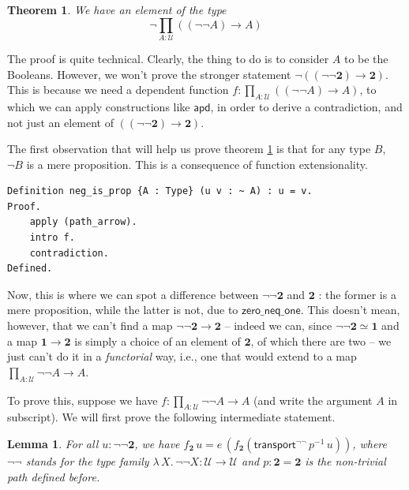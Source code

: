 \documentclass[12 pt]{amsart}
\newtheorem{theorem}[subsubsection]{Theorem}
\newtheorem{lemma}[subsubsection]{Lemma}
\theoremstyle{definition}
\theoremstyle{remark}
\newcommand{\Type}{\mathcal{U}}
\newcommand{\trans}{\mathsf{transport}}
\newcommand{\apd}{\mathsf{apd}}
\newcommand{\bool}{{\mathbf{2}}}
\newcommand{\one}{{\mathbf{1}}}
\newcommand{\no}{\lnot}
\newcommand{\zeroneqone}{{\mathsf{zero\_neq\_one}}}
\begin{document}
\begin{theorem}
We have an element of the type
\[\no \prod_{A : \Type} \left((\no \no A) \to A\right)\]
\label{thm:double_neg}
\end{theorem}

The proof is quite technical. Clearly, the thing to do is to consider $A$ to be the Booleans. However, we won't prove the stronger statement $\no ((\no \no \bool) \to \bool)$. This is because we need a dependent function $f : \prod_{A : \Type} \left((\no \no A) \to A\right)$, to which we can apply constructions like $\apd$, in order to derive a contradiction, and not just an element of $((\no \no \bool) \to \bool)$. 

The first observation that will help us prove theorem \ref{thm:double_neg} is that for any type $B$, $\no B$  is a mere proposition. This is a consequence of function extensionality.

\begin{lstlisting}
Definition neg_is_prop {A : Type} (u v : ~ A) : u = v.
Proof.
    apply (path_arrow).
    intro f.
    contradiction.
Defined.  
\end{lstlisting}

Now, this is where we can spot a difference between $\no\no \bool$ and $\bool$ : the former is a mere proposition, while the latter is not, due to $\zeroneqone$. This doesn't mean, however, that we can't find a map $\no\no\bool \to \bool$ -- indeed we can, since $\no\no\bool \simeq \one$ and a map $\one\to\bool$ is simply a choice of an element of $\bool$, of which there are two -- we just can't do it in a \textit{functorial} way, i.e., one that would extend to a map $\prod_{A : \Type} \no\no A \to A$.

To prove this, suppose we have $f : \prod_{A : \Type} \no\no A \to A$ (and write the argument $A$ in subscript). We will first prove the following intermediate statement.

\begin{lemma}
For all $u : \no\no\bool$, we have $ f_\bool\, u = e
\,(f_\bool (\trans^{\no\no} \,p^{-1}\, u))$, where $\no\no$ stands for the type family $\lambda \,X. \,\no\no X : \Type\to\Type$ and $p : \bool = \bool$ is the non-trivial path defined before.
\label{lemma_dn}
\end{lemma}
\end{document}
